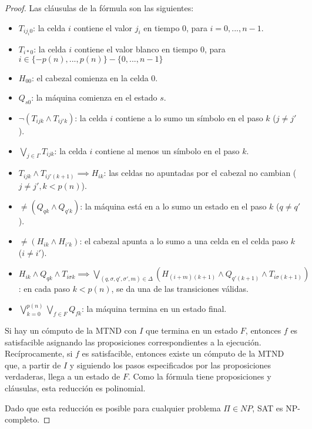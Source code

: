 \begin{proof}
    Las cláusulas de la fórmula son las siguientes:
    \begin{itemize}
        \item $T_{i j_i 0}$: la celda $i$ contiene el valor $j_i$ en tiempo $0$, para $i = 0, ..., n - 1$.
        \item $T_{i \ast 0}$: la celda $i$ contiene el valor blanco en tiempo $0$, para $i \in \{-p(n), ..., p(n)\} - \{0, ..., n - 1\}$
        \item $H_{00}$: el cabezal comienza en la celda $0$.
        \item $Q_{s0}$: la máquina comienza en el estado $s$.
        \item $\neg (T_{ijk} \land T_{ij'k})$: la celda $i$ contiene a lo sumo un símbolo en el paso $k$ ($j \neq j'$).
        \item $\bigvee_{j \in \Gamma} T_{ijk}$: la celda $i$ contiene al menos un símbolo en el paso $k$.
        \item $T_{ijk} \land T_{ij'(k+1)} \implies H_{ik}$: las celdas no apuntadas por el cabezal no cambian ($j \neq j', k < p(n)$).
        \item $\neq (Q_{qk} \land Q_{q'k})$: la máquina está en a lo sumo un estado en el paso $k$ ($q \neq q'$).
        \item $\neq (H_{ik} \land H_{i'k})$: el cabezal apunta a lo sumo a una celda en el celda paso $k$ ($i \neq i'$).
        \item $H_{ik} \land Q_{qk} \land T_{i \sigma k} \implies \bigvee_{(q, \sigma, q', \sigma', m) \in \Delta} (H_{(i+m)(k + 1)} \land Q_{q'(k + 1)} \land T_{i \sigma (k + 1)})$: en cada paso $k < p(n)$, se da una de las transiciones válidas.
        \item $\bigvee_{k = 0}^{p(n)} \bigvee_{f \in F} Q_{fk}$: la máquina termina en un estado final.
    \end{itemize}

    Si hay un cómputo de la MTND con $I$ que termina en un estado $F$, entonces $f$ es satisfacible asignando las proposiciones correspondientes a la ejecución. Recíprocamente, si $f$ es satisfacible, entonces existe un cómputo de la MTND que, a partir de $I$ y siguiendo los pasos especificados por las proposiciones verdaderas, llega a un estado de $F$. Como la fórmula tiene  proposiciones y  cláusulas, esta reducción es polinomial.

    Dado que esta reducción es posible para cualquier problema $\Pi \in NP$, SAT es NP-completo.
\end{proof}

